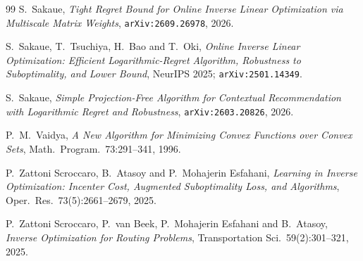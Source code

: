 \documentclass[11pt]{article}
\theoremstyle{plain}
\theoremstyle{definition}
\theoremstyle{remark}
\begin{document}
\begin{thebibliography}{99}
S.~Sakaue,
\emph{Tight Regret Bound for Online Inverse Linear Optimization via Multiscale Matrix Weights},
\texttt{arXiv:2609.26978}, 2026.

S.~Sakaue, T.~Tsuchiya, H.~Bao and T.~Oki,
\emph{Online Inverse Linear Optimization: Efficient Logarithmic-Regret Algorithm, Robustness to
Suboptimality, and Lower Bound},
NeurIPS 2025; \texttt{arXiv:2501.14349}.

S.~Sakaue,
\emph{Simple Projection-Free Algorithm for Contextual Recommendation with Logarithmic Regret and
Robustness},
\texttt{arXiv:2603.20826}, 2026.

P.~M.~Vaidya,
\emph{A New Algorithm for Minimizing Convex Functions over Convex Sets},
Math.\ Program.\ 73:291--341, 1996.

P.~Zattoni Scroccaro, B.~Atasoy and P.~Mohajerin Esfahani,
\emph{Learning in Inverse Optimization: Incenter Cost, Augmented Suboptimality Loss, and
Algorithms},
Oper.\ Res.\ 73(5):2661--2679, 2025.

P.~Zattoni Scroccaro, P.~van Beek, P.~Mohajerin Esfahani and B.~Atasoy,
\emph{Inverse Optimization for Routing Problems},
Transportation Sci.\ 59(2):301--321, 2025.

\end{thebibliography}
\end{document}
